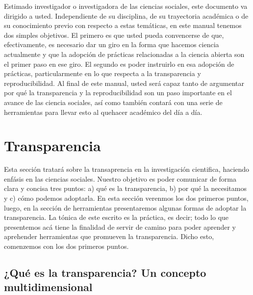 \documentclass[
]{book}
\begin{document}
Estimado investigador o investigadora de las ciencias sociales, este documento va dirigido a usted. Independiente de su disciplina, de su trayectoria académica o de su conocimiento previo con respecto a estas temáticas, en este manual tenemos dos simples objetivos. El primero es que usted pueda convencerse de que, efectivamente, es necesario dar un giro en la forma que hacemos ciencia actualmente y que la adopción de prácticas relacionadas a la ciencia abierta son el primer paso en ese giro. El segundo es poder instruirlo en esa adopción de prácticas, particularmente en lo que respecta a la transparencia y reproducibilidad. Al final de este manual, usted será capaz tanto de argumentar por qué la transparencia y la reproducibilidad son un paso importante en el avance de las ciencia sociales, así como también contará con una serie de herramientas para llevar esto al quehacer académico del día a día.

\hypertarget{transparencia}{%
\chapter{Transparencia}\label{transparencia}}

Esta sección tratará sobre la transaprencia en la investigación cientifica, haciendo enfásis en las ciencias sociales. Nuestro objetivo es poder comunicar de forma clara y concisa tres puntos: a) qué es la transparencia, b) por qué la necesitamos y c) cómo podemos adoptarla. En esta sección verenmos los dos primeros puntos, luego, en la sección de herramientas presentaremos algunas formas de adoptar la transparencia. La tónica de este escrito es la práctica, es decir; todo lo que presentemos acá tiene la finalidad de servir de camino para poder aprender y aprehender herramientas que promueven la transparencia. Dicho esto, comenzemos con los dos primeros puntos.

\hypertarget{quuxe9-es-la-transparencia-un-concepto-multidimensional}{%
\section{¿Qué es la transparencia? Un concepto multidimensional}\label{quuxe9-es-la-transparencia-un-concepto-multidimensional}}
\end{document}
